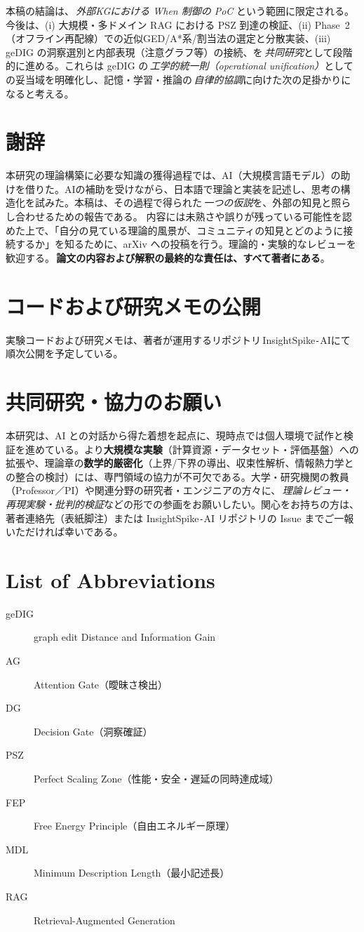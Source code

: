 \documentclass[ja=standard,xelatex]{bxjsarticle}
\begin{document}
本稿の結論は、\,\emph{外部KGにおける When 制御の PoC} という範囲に限定される。今後は、(i) 大規模・多ドメイン RAG における PSZ 到達の検証、(ii) Phase~2（オフライン再配線）での近似GED/A*系/割当法の選定と分散実装、(iii) geDIG の洞察選別と内部表現（注意グラフ等）の接続、を\,\emph{共同研究}として段階的に進める。これらは geDIG の\,\emph{工学的統一則（operational unification）}としての妥当域を明確化し、記憶・学習・推論の\,\emph{自律的協調}に向けた次の足掛かりになると考える。

\section*{謝辞}
本研究の理論構築に必要な知識の獲得過程では、AI（大規模言語モデル）の助けを借りた。AIの補助を受けながら、日本語で理論と実装を記述し、思考の構造化を試みた。本稿は、その過程で得られた\,\emph{一つの仮説}を、外部の知見と照らし合わせるための報告である。
内容には未熟さや誤りが残っている可能性を認めた上で、「自分の見ている理論的風景が、コミュニティの知見とどのように接続するか」を知るために、arXiv への投稿を行う。理論的・実験的なレビューを歓迎する。\,\textbf{論文の内容および解釈の最終的な責任は、すべて著者にある}。

\section*{コードおよび研究メモの公開}
実験コードおよび研究メモは、著者が運用するリポジトリ\,InsightSpike\texttt{-}AIにて順次公開を予定している。

\section*{共同研究・協力のお願い}
本研究は、AI との対話から得た着想を起点に、現時点では個人環境で試作と検証を進めている。より\textbf{大規模な実験}（計算資源・データセット・評価基盤）への拡張や、理論章の\textbf{数学的厳密化}（上界/下界の導出、収束性解析、情報熱力学との整合の検討）には、専門領域の協力が不可欠である。大学・研究機関の教員（Professor／PI）や関連分野の研究者・エンジニアの方々に、\,\emph{理論レビュー・再現実験・批判的検証}などの形での参画をお願いしたい。関心をお持ちの方は、著者連絡先（表紙脚注）または InsightSpike\texttt{-}AI リポジトリの Issue までご一報いただければ幸いである。

\section*{List of Abbreviations}
\begin{description}
  \item[geDIG] graph edit Distance and Information Gain
  \item[AG] Attention Gate（曖昧さ検出）
  \item[DG] Decision Gate（洞察確証）
  \item[PSZ] Perfect Scaling Zone（性能・安全・遅延の同時達成域）
  \item[FEP] Free Energy Principle（自由エネルギー原理）
  \item[MDL] Minimum Description Length（最小記述長）
  \item[RAG] Retrieval-Augmented Generation
\end{description}
\end{document}
